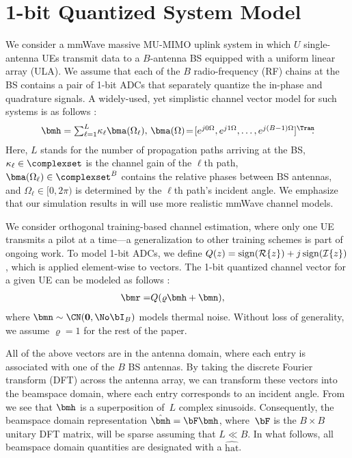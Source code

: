 \section{1-bit Quantized System Model}
\label{sec:systemmodel}

%
We consider a mmWave massive MU-MIMO uplink system in which $U$ single-antenna UEs transmit data to a $B$-antenna BS equipped with a uniform linear array (ULA). 
%
We assume that each of the $B$ radio-frequency (RF) chains at the BS contains a pair of 1-bit ADCs that separately quantize the in-phase and quadrature signals.
%
A widely-used, yet simplistic channel vector model for such systems is as follows \cite{tse05a}:
\begin{align} \label{eq:antenna_domain_channel}
\bmh =  \textstyle \sum_{\ell=1}^{L}{\!\kappa_\ell\bma(\Omega_\ell)}, \, \bma(\Omega)\! =\! [e^{j0\Omega}, e^{j1\Omega}, \ldots, e^{j(B-1)\Omega}]^\Tran\!\!.
\end{align}
%
Here, $L$ stands for the number of propagation paths arriving at the BS, $\kappa_\ell\in\complexset$ is the channel gain of the $\ell$th path, $\bma(\Omega_\ell)\in\complexset^B$ contains the relative phases between BS antennas, and $\Omega_\ell\in[0,2\pi)$ is determined by the $\ell$th path's incident angle.
%
We emphasize that our simulation results in  will use more realistic mmWave channel models. 

We consider orthogonal training-based channel estimation, where only one UE transmits a pilot at a time---a generalization to other training schemes is part of ongoing work. To model 1-bit ADCs, we define $Q(z) = \operatorname{sign}(\mathcal{R}\{z\}) + j \operatorname{sign}(\mathcal{I}\{z\})$, which is applied element-wise to vectors. The 1-bit quantized channel vector for a given UE can be modeled as follows \cite{li17b}:
\begin{align} \label{eq:quantized_antenna_domain}
\bmr = & Q\!\left(\varrho\bmh+\bmn\right)\!,
\end{align}
where $\bmn\sim\CN(\boldsymbol0,\No\bI_B)$ models thermal noise. Without loss of generality, we assume  $\varrho=1$ for the rest of the paper. 

All of the above vectors are in the antenna domain, where each entry is associated with one of the $B$ BS antennas. 
%
By taking the discrete Fourier transform (DFT) across the antenna array, we can transform these vectors into the beamspace domain, where each entry corresponds to an incident angle. 
%
From  we see that $\bmh$ is a superposition of~$L$ complex sinusoids. Consequently, the beamspace domain representation $\hhat = \bF\bmh$, where~$\bF$ is the $B\times B$ unitary DFT matrix, will be  sparse assuming that $L\ll B$. In what follows, all beamspace domain quantities are designated with a $\hat{\text{hat}}$.


